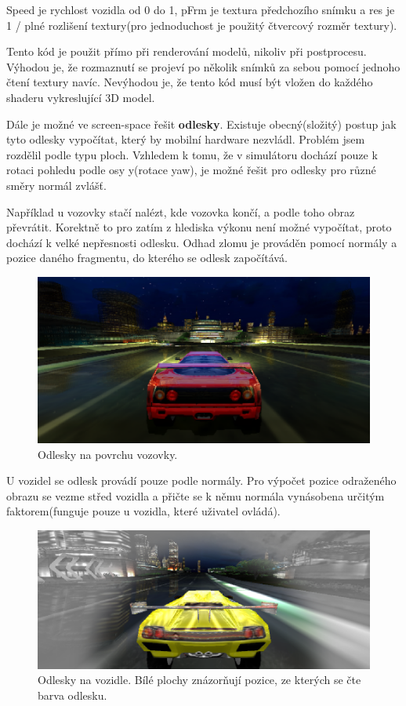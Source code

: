 \documentclass[11pt,twoside,a4paper]{book}
\begin{document}
Speed je rychlost vozidla od 0 do 1, pFrm je textura předchozího snímku a res je 1 / plné rozlišení textury(pro jednoduchost je použitý čtvercový rozměr textury).

Tento kód je použit přímo při renderování modelů, nikoliv při postprocesu. Výhodou je, že rozmaznutí se projeví po několik snímků za sebou pomocí jednoho čtení textury navíc. Nevýhodou je, že tento kód musí být vložen do každého shaderu vykreslující 3D model.
\bigskip

Dále je možné ve screen-space řešit \textbf{odlesky}. Existuje obecný(složitý) postup jak tyto odlesky vypočítat, který by mobilní hardware nezvládl. Problém jsem rozdělil podle typu ploch. Vzhledem k tomu, že v simulátoru dochází pouze k rotaci pohledu podle osy y(rotace yaw), je možné řešit pro odlesky pro různé směry normál zvlášť.

Například u vozovky stačí nalézt, kde vozovka končí, a podle toho obraz převrátit. Korektně to pro zatím z hlediska výkonu není možné vypočítat, proto dochází k velké nepřesnosti odlesku. Odhad zlomu je prováděn pomocí normály a pozice daného fragmentu, do kterého se odlesk započítává.

\begin{figure}[h!]
\includegraphics[width=150mm]{figures/reflect-horizont.png}
\caption{Odlesky na povrchu vozovky.}
\end{figure}
\bigskip

U vozidel se odlesk provádí pouze podle normály. Pro výpočet pozice odraženého obrazu se vezme střed vozidla a přičte se k němu normála vynásobena určitým faktorem(funguje pouze u vozidla, které uživatel ovládá).

\begin{figure}[h!]
\includegraphics[width=150mm]{figures/reflect-car.png}
\caption{Odlesky na vozidle. Bílé plochy znázorňují pozice, ze kterých se čte barva odlesku.}
\end{figure}
\newpage
\end{document}
